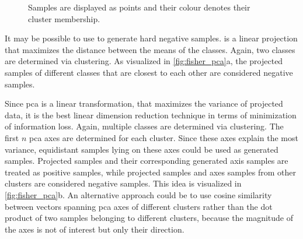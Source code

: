 \begin{figure}[!htb]%
    \centering
    \qquad
    \caption{Samples are displayed as points and their colour denotes their cluster membership.}%
    \label{fig:fisher_pca}%
\end{figure}

It may be possible to use \fisher{} to generate hard negative samples.
\fisher{} is a linear projection that maximizes the distance between the means of the classes.
Again, two classes are determined via clustering.
As visualized in \autoref{fig:fisher_pca}a, the projected samples of different classes that 
are closest to each other are considered negative samples.

Since \ac{pca} is a linear transformation, that maximizes the variance of projected data, 
it is the best linear dimension reduction technique in terms of minimization of information loss.
Again, multiple classes are determined via clustering.
The first $n$ \ac{pca} axes are determined for each cluster.
Since these axes explain the most variance, equidistant samples lying on these axes could be used as generated samples.
Projected samples and their corresponding generated axis samples are treated as positive samples, 
while projected samples and axes samples from other clusters are considered negative samples.
This idea is visualized in \autoref{fig:fisher_pca}b.
An alternative approach could be to use cosine similarity between vectors spanning \ac{pca} axes of different clusters 
rather than the dot product of two samples belonging to different clusters, 
because the magnitude of the axes is not of interest but only their direction.

